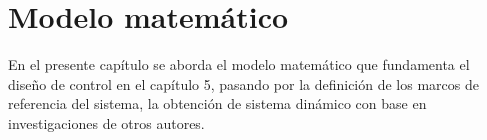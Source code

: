 \chapter{Modelo matemático}

En el presente capítulo se aborda el modelo matemático que fundamenta el diseño de control en el capítulo 5, pasando por
la definición de los marcos de referencia del sistema, la obtención de sistema dinámico con base en
investigaciones de otros autores.

